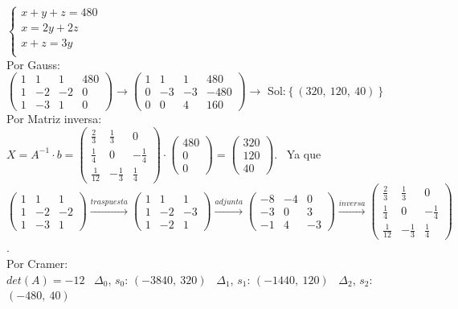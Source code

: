 \documentclass[addpoints,spanish, 12pt,a4paper]{exam}
\begin{document}
\begin{questions}
\begin{parts}
\begin{solution}
$\left\{\begin{matrix}x + y + z = 480\\x = 2 y + 2 z\\x + z = 3 y\\\end{matrix}\right.$ \\  Por Gauss: \\ $\left(\begin{matrix}1 & 1 & 1 & 480\\1 & -2 & -2 & 0\\1 & -3 & 1 & 0\end{matrix}\right)\rightarrow\left(\begin{matrix}1 & 1 & 1 & 480\\0 & -3 & -3 & -480\\0 & 0 & 4 & 160\end{matrix}\right)\to$ Sol:$\left\{\left( 320, \  120, \  40\right)\right\}$ \\ Por Matriz inversa: \\ $X=A^{-1}\cdot b=\left(\begin{matrix}\frac{2}{3} & \frac{1}{3} & 0\\\frac{1}{4} & 0 & - \frac{1}{4}\\\frac{1}{12} & - \frac{1}{3} & \frac{1}{4}\end{matrix}\right)\cdot\left(\begin{matrix}480\\0\\0\end{matrix}\right)=\left(\begin{matrix}320\\120\\40\end{matrix}\right)$. \ Ya que $\left(\begin{matrix}1 & 1 & 1\\1 & -2 & -2\\1 & -3 & 1\end{matrix}\right)\xrightarrow{traspuesta}\left(\begin{matrix}1 & 1 & 1\\1 & -2 & -3\\1 & -2 & 1\end{matrix}\right)\xrightarrow{adjunta}\left(\begin{matrix}-8 & -4 & 0\\-3 & 0 & 3\\-1 & 4 & -3\end{matrix}\right)\xrightarrow{inversa}\left(\begin{matrix}\frac{2}{3} & \frac{1}{3} & 0\\\frac{1}{4} & 0 & - \frac{1}{4}\\\frac{1}{12} & - \frac{1}{3} & \frac{1}{4}\end{matrix}\right)$. \\ Por Cramer: \\ $det(A)=-12$ \ $\Delta_0$, $s_0$: $\left( -3840, \  320\right)$ \ $\Delta_1$, $s_1$: $\left( -1440, \  120\right)$ \ $\Delta_2$, $s_2$: $\left( -480, \  40\right)$ \ \end{solution}

\end{parts}
\end{questions}
\end{document}
